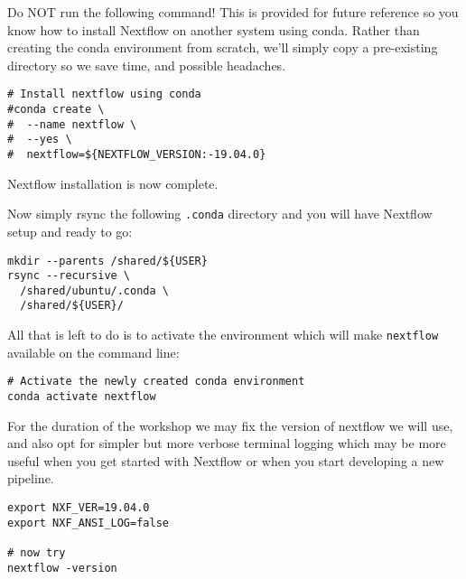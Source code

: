 \begin{warning}

Do NOT run the following command! This is provided for future reference so you know how to install Nextflow on another system using conda. Rather than
creating the conda environment from scratch, we'll simply copy a pre-existing directory so we save time, and possible headaches.

\begin{lstlisting}
# Install nextflow using conda
#conda create \
#  --name nextflow \
#  --yes \
#  nextflow=${NEXTFLOW_VERSION:-19.04.0}
\end{lstlisting}


Nextflow installation is now complete.

\end{warning}



Now simply rsync the following \texttt{.conda} directory and you
will have Nextflow setup and ready to go:


\begin{steps}
\begin{lstlisting}
mkdir --parents /shared/${USER}
rsync --recursive \
  /shared/ubuntu/.conda \
  /shared/${USER}/
\end{lstlisting}
\end{steps}

All that is left to do is to activate the environment which will make \texttt{nextflow} available on the command line:
\begin{steps}
\begin{lstlisting}
# Activate the newly created conda environment
conda activate nextflow
\end{lstlisting}

\end{steps}






For the duration of the workshop we may fix the version of nextflow we will use, 
and also opt for simpler but more verbose terminal logging 
which may be more useful when you get started with Nextflow 
or when you start developing a new pipeline.

\begin{steps}
\begin{lstlisting}
export NXF_VER=19.04.0
export NXF_ANSI_LOG=false

# now try
nextflow -version
\end{lstlisting}
\end{steps}

